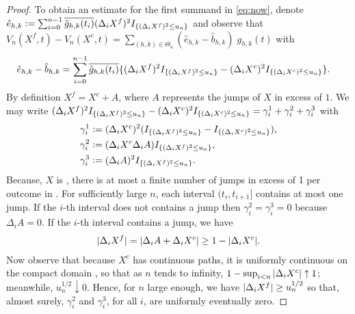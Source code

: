 \begin{proof}
To obtain an estimate for the first summand in \eqref{eq:now}, denote
    $\hat{e}_{h,k} := \sum_{i =0}^{n-1} \overline{\tilde{g}_{h,k}(t_i)} (\Delta_i X^f)^2I_{\{(\Delta_i X^f)^2 \le  u_n\}}$ 
  and observe that 
  $V_n(X^f,t)  - V_n(X^c, t) = \sum_{(h,k) \in \Theta_n} (\hat{e}_{h,k} - \hat{b}_{h,k})\;g_{h,k}(t)$ 
with 
\begin{align}
  \hat{e}_{h,k} - \hat{b}_{h,k}  &= \sum_{i =0}^{n-1} \overline{\tilde{g}_{h,k}(t_i)}\{ (\Delta_i X^f)^2 I_{\{(\Delta_i X^f)^2 \le u_n\}}- (\Delta_i X^c)^2 I_{\{(\Delta_i X^c)^2 \le u_n\}}\}.\notag
  \label{}
\end{align}
By definition $X^f = X^c + A$, where $A$ represents the jumps of $X$ in excess of $1$.  
We may write $ (\Delta_i X^f)^2 I_{\{(\Delta_i X^f)^2 \le u_n\}}- (\Delta_i X^c)^2 I_{\{(\Delta_i X^c)^2 \le u_n\}} = \gamma^1_i + \gamma^2_i + \gamma^3_i$ with 
  \begin{align}
  &\gamma^1_i := (\Delta_i X^c)^2 (I_{\{(\Delta_i X^f)^2 \le u_n\}}-  I_{\{(\Delta_i X^c)^2 \le u_n\}}), \notag \\
  &\gamma^2_i := (\Delta_i X^c \Delta_i A) I_{\{(\Delta_i X^f)^2 \le u_n\}}, \notag\\ 
  &\gamma^3_i := (\Delta_i A)^2 I_{\{(\Delta_i X^f)^2 \le u_n\}}. 
  \end{align}
Because, $X$ is \cadlag, there is at most a finite number of  jumps in excess of 1  per outcome in \domain. For sufficiently large $n$, each interval $(t_{i} , t_{i + 1}]$  contains at most one  jump.  If the $i$-th interval does not contains a jump    then $\gamma^2_i = \gamma^3_i = 0$ because $\Delta_i A = 0$.   If the $i$-th interval contains a jump, we have  
\begin{align}
  \vert\Delta_i X^f\vert = \vert\Delta_i A+ \Delta_i X^c\vert \ge 1 - \vert \Delta_i X^c \vert.\label{eq:well1}
\end{align}
Now observe that because $X^c$ has  continuous paths, it is uniformly continuous on the compact domain \domain, so that   as $n$ tends to infinity, $1 - \sup_{i < n}\vert \Delta_i X^c \vert \uparrow 1$;  meanwhile, $u_n^{1/2} \downarrow 0$. Hence, for $n$ large enough, we have $\vert \Delta_i X^f \vert \ge u_n^{1/2}$ so that, almost surely,  $\gamma^2_i$ and $\gamma_i^3$, for all $i$,  are uniformly  eventually zero.


\end{proof}
